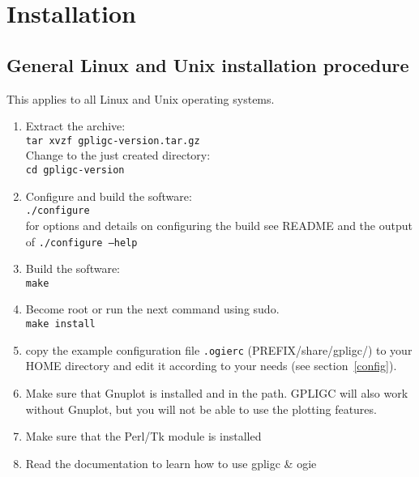 \section{Installation}

\subsection{General Linux and Unix installation procedure}
\label{unix_install}
\label{linux_install}

This applies to all Linux and Unix operating systems.

\begin{enumerate}

\item Extract the archive: \\
\texttt{tar xvzf gpligc-version.tar.gz} \\
Change to the just created directory: \\
\texttt{cd gpligc-version}

\item Configure and build the software:\\
\texttt{./configure}\\
for options and details on configuring the build see README and the output of \texttt{./configure --help}

\item Build the software:\\
\texttt{make}

\item  \label{root}
Become root or run the next command using sudo.\\
\texttt{make install}

\item copy the example configuration file
\texttt{.ogierc} (PREFIX/share/gpligc/) to your HOME directory
and edit it according to your needs (see section~\ref{config}).

\item Make sure that Gnuplot \cite{gnuplot} is installed and in the path.
GPLIGC will also work without Gnuplot,  but you will not be able to use the plotting features.

\item Make sure that the Perl/Tk \cite{perltk} module is installed

\item Read the documentation to learn how to use gpligc \& ogie

\end{enumerate}


